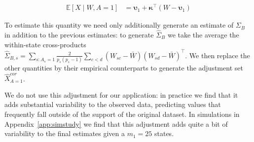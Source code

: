\begin{align}\label{eqn:xcoradjust}
    \mathbb{E}[X \mid W, A = 1] &=  \boldsymbol{\upsilon}_1 + \boldsymbol{\kappa}^\top(W - \boldsymbol{\upsilon}_1)  
\end{align}

To estimate this quantity we need only additionally generate an estimate of $\Sigma_B$ in addition to the previous estimates: to generate $\hat{\Sigma}_B$ we take the average the within-state cross-products $\hat{\Sigma}_{B, s} = \sum_{s: A_s = 1}\frac{2}{p_s(p_s - 1)}\sum_{c < d}(W_{sc} - \bar{W})(W_{sd} - \bar{W})^\top$. We then replace the other quantities by their empirical counterparts to generate the adjustment set $\hat{X}_{A=1}^{cor}$.

We do not use this adjustment for our application: in practice we find that it adds substantial variability to the observed data, predicting values that frequently fall outside of the support of the original dataset. In simulations in Appendix~\ref{app:simstudy} we find that this adjustment adds quite a bit of variability to the final estimates given a $m_1 = 25$ states. 